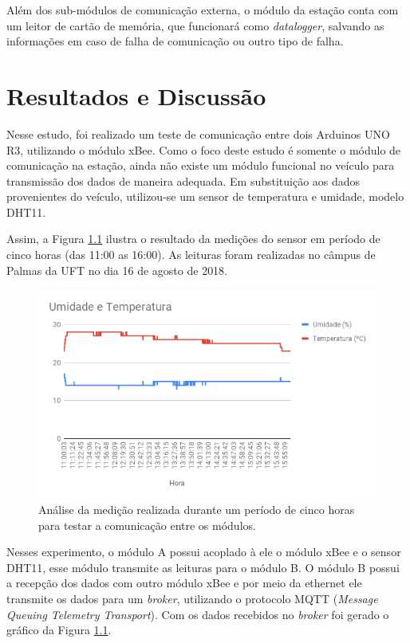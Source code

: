 \documentclass[12pt]{uftpibicsic2018}
\begin{document}
Além dos sub-módulos de comunicação externa, o módulo da estação conta com um leitor de cartão de memória, que funcionará como \textit{datalogger}, salvando as informações em caso de falha de comunicação ou outro tipo de falha.

\chapter{Resultados e Discussão}\vskip -12pt

Nesse estudo, foi realizado um teste de comunicação entre dois Arduinos UNO R3, utilizando o módulo xBee. Como o foco deste estudo é somente o módulo de comunicação na estação, ainda não existe um módulo funcional no veículo para transmissão dos dados de maneira adequada. Em substituição aos dados provenientes do veículo, utilizou-se um sensor de temperatura e umidade, modelo DHT11.

Assim, a Figura \ref{fig:umtemp} ilustra o resultado da medições do sensor em período de cinco horas (das 11:00 as 16:00). As leituras foram realizadas no câmpus de Palmas da UFT no dia 16 de agosto de 2018.

\begin{figure}[!h]
\centering
\includegraphics[width=12cm]{Umidade_e_Temperatura_.png}
\caption{Análise da medição realizada durante um período de cinco horas para testar a comunicação entre os módulos.}
\label{fig:umtemp}
\end{figure}

Nesses experimento, o módulo A possui acoplado à ele o módulo xBee e o sensor DHT11, esse módulo transmite as leituras para o módulo B. O módulo B possui a recepção dos dados com outro módulo xBee e por meio da ethernet ele transmite os dados para um \textit{broker}, utilizando o protocolo MQTT (\textit{Message Queuing Telemetry Transport}). Com os dados recebidos no \textit{broker} foi gerado o gráfico da Figura \ref{fig:umtemp}.
\end{document}

